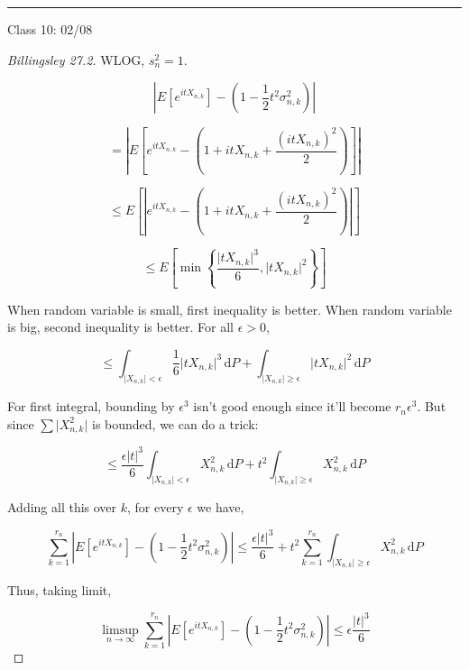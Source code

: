 \documentclass{article}
\theoremstyle{definition}
\begin{document}
\hfil
\hrule

Class 10: 02/08

\begin{proof}
    [Billingsley 27.2]

    WLOG, \(s_n^2 = 1\).

    \[
        \left\vert E[e^{it X_{n,k}}] - \left( 1 - \frac{1}{2}t^2 \sigma_{n,k}^2 \right)  \right\vert 
    \]

    \[
        = \left\vert E \left[ e^{it X_{n,k}} - \left( 1 + i t X_{n,k} + \frac{(it X_{n,k})^2}{2} \right)  \right]  \right\vert 
    \]

    \[
        \leq E \left[ \left\lvert e^{it X_{n,k}} - \left( 1 + i t X_{n,k} + \frac{(it X_{n,k})^2}{2} \right) \right\rvert \right]
    \]

    \[
        \leq E \left[ \min\left\{ \frac{\vert t X_{n,k} \vert ^3}{6}, \vert t X_{n,k} \vert ^2 \right\}  \right] 
    \]

    When random variable is small, first inequality is better. When random variable is big, second inequality is better. For all \(\epsilon > 0\),

    \[
        \leq \int_{\vert X_{n,k} \vert < \epsilon}^{} \frac{1}{6}\vert t X_{n,k} \vert ^3 \,\mathrm{d}P + \int_{\vert X_{n,k} \vert \geq \epsilon}^{} \vert t X_{n,k} \vert ^2 \,\mathrm{d}P 
    \]

    For first integral, bounding by \(\epsilon^3\) isn't good enough since it'll become \(r_n \epsilon ^3\). But since \(\sum \vert X_{n,k}^2 \vert \) is bounded, we can do a trick:

    \[
        \leq \frac{\epsilon \vert t \vert ^3}{6} \int_{\vert X_{n,k} \vert < \epsilon }^{} X_{n,k}^2 \,\mathrm{d}P + t^2 \int_{\vert X_{n,k} \vert \geq \epsilon }^{} X_{n,k}^2 \,\mathrm{d}P  
    \]

    Adding all this over \(k\), for every \(\epsilon\) we have,

    \[
        \sum_{k=1}^{r_n} \left\vert E[e^{itX_{n,k}}]  - \left( 1 - \frac{1}{2}t^2 \sigma ^2_{n,k} \right) \right\vert \leq \frac{\epsilon \vert t \vert ^3}{6} + t^2 \sum_{k=1}^{r_n} \int_{\vert X_{n,k} \vert \geq \epsilon}^{} X_{n,k}^2 \,\mathrm{d}P 
    \]

    Thus, taking limit,

    \[
        \limsup_{n \to \infty} \sum_{k=1}^{r_n} \left\vert E[e^{itX_{n,k}}]  - \left( 1 - \frac{1}{2}t^2 \sigma ^2_{n,k} \right) \right\vert \leq \epsilon \frac{\vert t \vert ^3}{6}
    \]


\end{proof}
\end{document}

